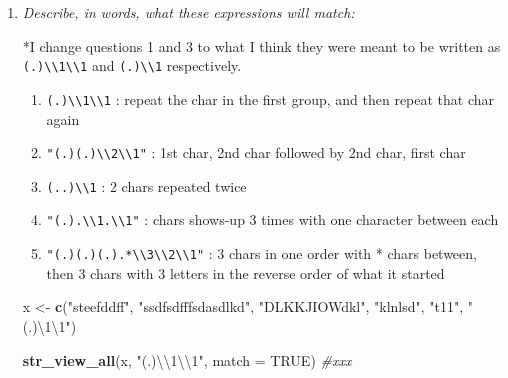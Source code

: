 \documentclass[]{book}
\newenvironment{Shaded}{\begin{snugshade}}{\end{snugshade}}
\newcommand{\CharTok}[1]{\textcolor[rgb]{0.31,0.60,0.02}{#1}}
\newcommand{\CommentTok}[1]{\textcolor[rgb]{0.56,0.35,0.01}{\textit{#1}}}
\newcommand{\DataTypeTok}[1]{\textcolor[rgb]{0.13,0.29,0.53}{#1}}
\newcommand{\KeywordTok}[1]{\textcolor[rgb]{0.13,0.29,0.53}{\textbf{#1}}}
\newcommand{\NormalTok}[1]{#1}
\newcommand{\OtherTok}[1]{\textcolor[rgb]{0.56,0.35,0.01}{#1}}
\newcommand{\StringTok}[1]{\textcolor[rgb]{0.31,0.60,0.02}{#1}}
\providecommand{\tightlist}{%
  \setlength{\itemsep}{0pt}\setlength{\parskip}{0pt}}
\theoremstyle{definition}
\theoremstyle{definition}
\theoremstyle{definition}
\theoremstyle{remark}
\begin{document}
\begin{enumerate}
\def\labelenumi{\arabic{enumi}.}
\item
  \emph{Describe, in words, what these expressions will match:}

  *I change questions 1 and 3 to what I think they were meant to be
  written as
  \texttt{(.)\textbackslash{}\textbackslash{}1\textbackslash{}\textbackslash{}1}
  and \texttt{(.)\textbackslash{}\textbackslash{}1} respectively.

  \begin{enumerate}
  \def\labelenumii{\arabic{enumii}.}
  \tightlist
  \item
    \texttt{(.)\textbackslash{}\textbackslash{}1\textbackslash{}\textbackslash{}1}
    : repeat the char in the first group, and then repeat that char
    again
  \item
    \texttt{"(.)(.)\textbackslash{}\textbackslash{}2\textbackslash{}\textbackslash{}1"}
    : 1st char, 2nd char followed by 2nd char, first char
  \item
    \texttt{(..)\textbackslash{}\textbackslash{}1} : 2 chars repeated
    twice
  \item
    \texttt{"(.).\textbackslash{}\textbackslash{}1.\textbackslash{}\textbackslash{}1"}
    : chars shows-up 3 times with one character between each
  \item
    \texttt{"(.)(.)(.).*\textbackslash{}\textbackslash{}3\textbackslash{}\textbackslash{}2\textbackslash{}\textbackslash{}1"}
    : 3 chars in one order with * chars between, then 3 chars with 3
    letters in the reverse order of what it started
  \end{enumerate}

\begin{Shaded}
\begin{Highlighting}[]
\NormalTok{x <-}\StringTok{ }\KeywordTok{c}\NormalTok{(}\StringTok{"steefddff"}\NormalTok{, }\StringTok{"ssdfsdfffsdasdlkd"}\NormalTok{, }\StringTok{"DLKKJIOWdkl"}\NormalTok{, }\StringTok{"klnlsd"}\NormalTok{, }\StringTok{"t11"}\NormalTok{, }\StringTok{"(.)\textbackslash{}1\textbackslash{}1"}\NormalTok{)}

\KeywordTok{str_view_all}\NormalTok{(x, }\StringTok{"(.)}\CharTok{\textbackslash{}\textbackslash{}}\StringTok{1}\CharTok{\textbackslash{}\textbackslash{}}\StringTok{1"}\NormalTok{, }\DataTypeTok{match =} \OtherTok{TRUE}\NormalTok{) }\CommentTok{#xxx}
\end{Highlighting}
\end{Shaded}


\end{enumerate}
\end{document}
